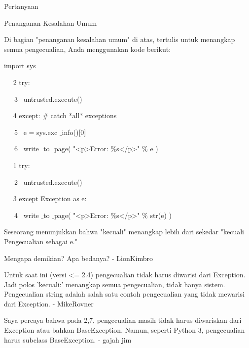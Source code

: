 Pertanyaan \par
\vspace{12pt}
Penanganan Kesalahan Umum \par
\vspace{12pt}
Di bagian "penanganan kesalahan umum" di atas, tertulis untuk menangkap semua pengecualian, Anda menggunakan kode berikut: \par
\vspace{12pt}
import sys \par
~~ 2 try: \par
\vspace{12pt}
~~~3~  untrusted.execute() \par
\vspace{12pt}
~~ 4 except:  $  \#  $ catch *all* exceptions \par
\vspace{12pt}
~~~5~  e = sys.exc $  \_  $info()[0] \par
\vspace{12pt}
~~~6~  write $  \_  $to $  \_  $page( "<p>Error:  $  \%  $s</p>"  $  \%  $ e ) \par
\vspace{12pt}
~~ 1 try: \par
\vspace{12pt}
~~~2~  untrusted.execute() \par
\vspace{12pt}
~~ 3 except Exception as e: \par
\vspace{12pt}
~~~4~  write $  \_  $to $  \_  $page( "<p>Error:  $  \%  $s</p>"  $  \%  $ str(e) ) \par
\vspace{12pt}
Seseorang menunjukkan bahwa "kecuali" menangkap lebih dari sekedar "kecuali Pengecualian sebagai e." \par
\vspace{12pt}
Mengapa demikian? Apa bedanya? - LionKimbro \par
\vspace{12pt}
Untuk saat ini (versi <= 2.4) pengecualian tidak harus diwarisi dari Exception. Jadi polos 'kecuali:' menangkap semua pengecualian, tidak hanya sistem. Pengecualian string adalah salah satu contoh pengecualian yang tidak mewarisi dari Exception. - MikeRovner \par
\vspace{12pt}
Saya percaya bahwa pada 2,7, pengecualian masih tidak harus diwariskan dari Exception atau bahkan BaseException. Namun, seperti Python 3, pengecualian harus subclass BaseException. - gajah jim \par
